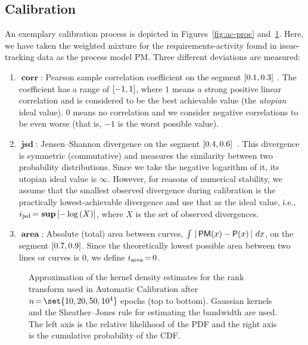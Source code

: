 \subsection{Calibration}
%
An exemplary calibration process is depicted in Figures~\ref{fig:ac-proc} and~\ref{fig:ac-approx}.
Here, we have taken the weighted mixture for the requirements-activity found in issue-tracking data as the process model \textsf{PM}.
Three different deviations are measured:
%
\begin{enumerate}[itemsep=.5ex]
    \item $\operatorname{\mathbf{corr}}$: Pearson sample correlation coefficient on the segment $\interval{0.1}{0.3}$ \cite{pearson1895corr} \cite[p.~116]{honel2023fdtr}. The coefficient has a range of $\interval{-1}{1}$, where $1$ means a strong positive linear correlation and is considered to be the best achievable value (the \emph{utopian} ideal value). $0$ means no correlation and we consider negative correlations to be even worse (that is, $-1$ is the worst possible value).
    \item $\operatorname{\mathbf{jsd}}$: Jensen--Shannon divergence on the segment $\interval{0.4}{0.6}$~\cite{Menendez1997jsd}. This divergence is symmetric (commutative) and measures the similarity between two probability distributions. Since we take the negative logarithm of it, its utopian ideal value is $\infty$. However, for reasons of numerical stability, we assume that the smallest observed divergence during calibration is the practically lowest-achievable divergence and use that as the ideal value, i.e., $i_{\operatorname{jsd}}\,{=}\,\operatorname{\mathbf{sup}}\left[-\log{\left(X\right)}\right]$, where $X$ is the set of observed divergences.
    \item $\operatorname{\mathbf{area}}$: Absolute (total) area between curves, $\int\,\left\lvert\,\mathsf{PM}(x)-\mathsf{P}(x)\,\right\rvert\,dx$, on the segment $\interval{0.7}{0.9}$. Since the theoretically lowest possible area between two lines or curves is $0$, we define $i_{\operatorname{area}}\,{=}\,0$.
\end{enumerate}


\begin{figure}[!t]
    \makebox[\textwidth][c]{}
    \caption[Approximation of the kernel density estimates for the rank transform used in Automatic Calibration.]{{\small Approximation of the kernel density estimates for the rank transform used in Automatic Calibration after $n\tight{=}\set{10,20,50,10^4}$ epochs (top to bottom). Gaussian kernels and the Sheather--Jones rule for estimating the bandwidth are used. The left axis is the relative likelihood of the PDF and the right axis is the cumulative probability of the CDF.}}
    \label{fig:ac-approx}
\end{figure}


